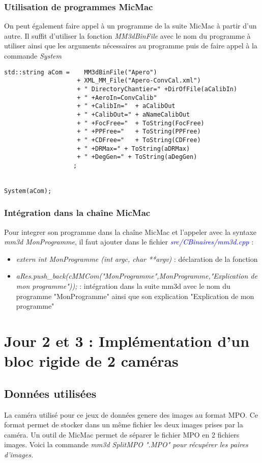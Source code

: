 \documentclass{article}
\newcommand\file[1]{
\textit{\textcolor{blue}{#1}}
}
\begin{document}
\subsubsection{Utilisation de programmes MicMac}
On peut également faire appel à un programme de la suite MicMac à partir d'un autre.
Il suffit d'utiliser la fonction \emph{MM3dBinFile} avec le nom du programme à utiliser ainsi que les arguments nécessaires au programme puis de faire appel à la commande  \emph{System}
\begin{verbatim}
std::string aCom =    MM3dBinFile("Apero")
                    + XML_MM_File("Apero-ConvCal.xml")
                    + " DirectoryChantier=" +DirOfFile(aCalibIn)
                    + " +AeroIn=ConvCalib"
                    + " +CalibIn="  + aCalibOut
                    + " +CalibOut=" + aNameCalibOut
                    + " +FocFree="  + ToString(FocFree)
                    + " +PPFree="   + ToString(PPFree)
                    + " +CDFree="   + ToString(CDFree)
                    + " +DRMax=" + ToString(aDRMax)
                    + " +DegGen=" + ToString(aDegGen)
                   ;


System(aCom);
\end{verbatim}
   
\subsubsection{Intégration dans la chaîne MicMac}
Pour integrer son programme dans la chaîne MicMac et l'appeler avec la syntaxe \emph{mm3d MonProgramme}, il faut ajouter dans le fichier \file{src/CBinaires/mm3d.cpp} :
\begin{itemize}
\item \emph{extern int MonProgramme (int argc, char **argv)} : déclaration de la fonction
\item \emph{aRes.push\_back(cMMCom("MonProgramme",MonProgramme,"Explication de mon programme"));} : intégration dans la suite mm3d avec le nom du programme "MonProgramme" ainsi que son explication "Explication de mon programme"
\end{itemize}

\section{Jour 2 et 3 : Implémentation d'un bloc rigide de 2 caméras}

\subsection{Données utilisées}
La caméra utilisé pour ce jeux de données genere des images au format MPO.
Ce format permet de stocker dans un même fichier les deux images prises par la caméra.
Un outil de MicMac permet de séparer le fichier MPO en 2 fichiers images.
Voici la commande
\emph{mm3d SplitMPO ".MPO" pour récupérer les paires d'images.}
\end{document}
